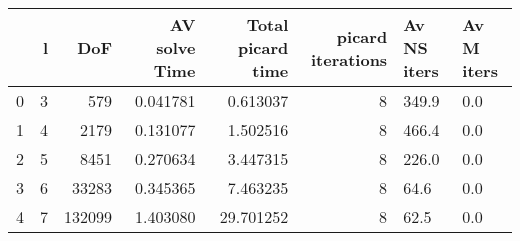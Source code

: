 \begin{tabular}{lrrrrrll}
\toprule
{} &  l &     DoF &  AV solve Time &  Total picard time &  picard iterations & Av NS iters & Av M iters \\
\midrule
0 &  3 &     579 &       0.041781 &           0.613037 &                  8 &       349.9 &        0.0 \\
1 &  4 &    2179 &       0.131077 &           1.502516 &                  8 &       466.4 &        0.0 \\
2 &  5 &    8451 &       0.270634 &           3.447315 &                  8 &       226.0 &        0.0 \\
3 &  6 &   33283 &       0.345365 &           7.463235 &                  8 &        64.6 &        0.0 \\
4 &  7 &  132099 &       1.403080 &          29.701252 &                  8 &        62.5 &        0.0 \\
\bottomrule
\end{tabular}
